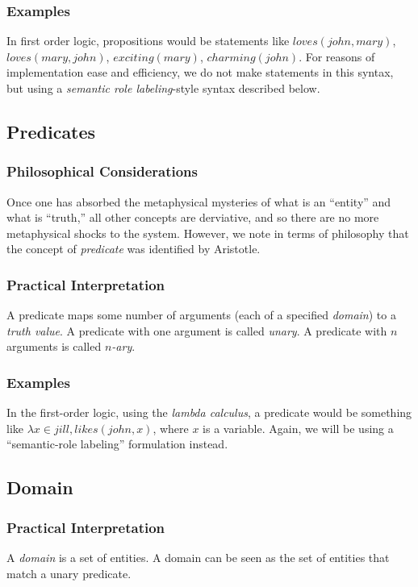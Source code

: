 \documentclass[12pt]{article}
\begin{document}
\subsubsection{Examples}
In first order logic, propositions would be statements like $loves(john, mary)$, $loves(mary, john)$, $exciting(mary)$, $charming(john)$.
For reasons of implementation ease and efficiency, we do not make statements in this syntax, but using a {\em semantic role labeling}-style syntax described below.

\subsection{Predicates}
\subsubsection{Philosophical Considerations}
Once one has absorbed the metaphysical mysteries of what is an ``entity'' and what is ``truth,'' all other concepts are derviative, and so there are no more metaphysical shocks to the system.
However, we note in terms of philosophy that the concept of {\em predicate} was identified by Aristotle.
\subsubsection{Practical Interpretation}
A predicate maps some number of arguments (each of a specified {\em domain}) to a {\em truth value}.
A predicate with one argument is called {\em unary}.
A predicate with $n$ arguments is called {\em $n$-ary}.

\subsubsection{Examples}
In the first-order logic, using the {\em lambda calculus}, a predicate would be something like $\lambda x \in jill, likes(john, x)$, where $x$ is a variable.
Again, we will be using a ``semantic-role labeling'' formulation instead.

\subsection{Domain}
\subsubsection{Practical Interpretation}
A {\em domain} is a set of entities.
A domain can be seen as the set of entities that match a unary predicate.
\end{document}
